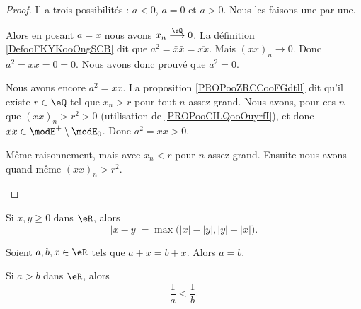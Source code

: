 \begin{proof}
	Il a trois possibilités : \( a<0\), \( a=0\) et \( a>0\). Nous les faisons une par une.
	\begin{subproof}
		\spitem[Si \( a=0\)]
		Alors en posant \( a=\bar x\) nous avons \( x_n\stackrel{ \eQ}{\longrightarrow} 0\). La définition \ref{DefooFKYKooOngSCB} dit que \( a^2=\bar x\bar x=\overline{xx}\). Mais \( (xx)_n\to 0\). Donc \( a^2=\overline{xx}=\bar 0=0\). Nous avons donc prouvé que \( a^2=0\).

		\spitem[Si \( a>0\)]
		Nous avons encore \( a^2=\overline{xx}\). La proposition \ref{PROPooZRCCooFGdtll} dit qu'il existe \( r\in \eQ\) tel que \( x_n>r\) pour tout \( n\) assez grand. Nous avons, pour ces \( n\) que \( (xx)_n>r^2>0\) (utilisation de \ref{PROPooCILQooOuyrfI}), et donc \( xx\in \modE^+\setminus\modE_0\). Donc \( a^2=\overline{xx}>0\).

		\spitem[Si \( a<0\)]
		Même raisonnement, mais avec \( x_n<r\) pour \( n\) assez grand. Ensuite nous avons quand même \( (xx)_n>r^2\).
	\end{subproof}
\end{proof}


\begin{proposition}	\label{PROPooRJOWooGbieCA}
	Si \( x,y\geq 0\) dans \( \eR\), alors
	\begin{equation}
		| x-y |=\max\big( | x |-| y |,| y |-| x | \big).
	\end{equation}
\end{proposition}


\begin{lemma}       \label{LEMooFQMVooDNaTDT}
	Soient \( a,b,x\in \eR\) tels que \( a+x=b+x\). Alors \( a=b\).
\end{lemma}

\begin{proposition}		\label{PROPooVIDJooSzXPLP}
	Si \( a>b\) dans \( \eR\), alors
	\begin{equation}
		\frac{1}{ a}<\frac{1}{ b}.
	\end{equation}
\end{proposition}

